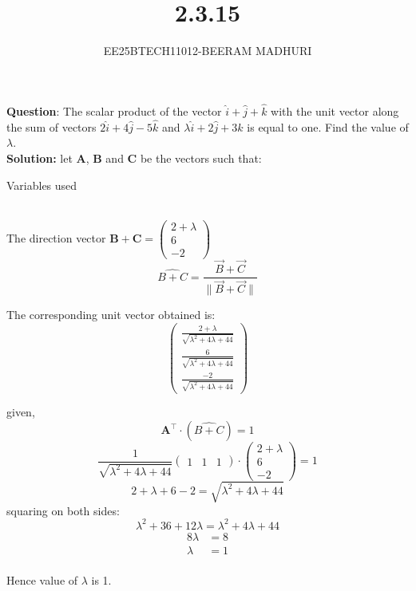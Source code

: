 \documentclass[journal]{IEEEtran}
\begin{document}

\vspace{3cm}

\title{2.3.15}
\author{EE25BTECH11012-BEERAM MADHURI}
{\let\newpage\relax\maketitle}

\renewcommand{\thefigure}{\theenumi}
\renewcommand{\thetable}{\theenumi}
\setlength{\intextsep}{10pt} %


\renewcommand{\thetable}{\theenumi}


\textbf{Question}:
The scalar product of the vector $\hat{i}+\hat{j}+\hat{k}$ with the unit vector along the sum of vectors $2\hat{i} + 4\hat{j} - 5\hat{k}$ and $\lambda \hat{i} + 2\hat{j} + 3\hat{k}$ is equal to one. Find the value of $\lambda$.\\
\textbf{Solution: }
let $\mathbf{A}$, $\mathbf{B}$ and $\mathbf{C}$ be the vectors such that:
\begin{table}[h!]
    \centering
    
    \caption{Variables used}
    \label{table 1.9.1}
\end{table}\\
The direction vector $\mathbf{B}+\mathbf{C} = \begin{pmatrix} 2+\lambda \\ 6 \\ -2 \end{pmatrix}$\\
\[\hat{B+C} = \frac{\vec{B} + \vec{C}}{\|\vec{B} + \vec{C}\|}\]

The corresponding unit vector obtained is:
\[\begin{pmatrix}\frac{2+\lambda}{\sqrt{\lambda^2 + 4\lambda + 44}} \\\frac{6}{\sqrt{\lambda^2 + 4\lambda + 44}} \\\frac{-2}{\sqrt{\lambda^2 + 4\lambda + 44}}\end{pmatrix}\]

given,
\[ \mathbf{A^\top} \cdot (\hat{B+C}) = 1\]
\[\frac{1}{\sqrt{\lambda^2 + 4\lambda + 44}} \begin{pmatrix}1 & 1 & 1 \end{pmatrix} \cdot \begin{pmatrix} 2+\lambda \\ 6 \\ -2 \end{pmatrix} = 1\]
\[2 + \lambda + 6 - 2 = \sqrt{\lambda^2 + 4\lambda + 44}\]
squaring on both sides:
\[\lambda^2 + 36 + 12\lambda = \lambda^2 + 4\lambda + 44\]
\[\begin{aligned}8\lambda &= 8 \\\lambda &= 1\end{aligned}\]\\
Hence value of $\lambda$ is 1.
\end{document}

